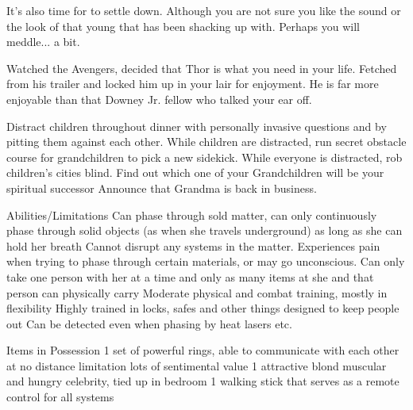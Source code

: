 \documentclass[char]{LRSguildcamp1}
\begin{document}
It's also time for \cYoungest {} to settle down. Although you are not sure you like the sound or the look of that young \cYS{\hero} that \cYoungest{} has been shacking up with. Perhaps you will meddle... a bit. 

Watched the Avengers, decided that Thor is what you need in your life. Fetched \cChrisHemsworth{\intro} from his trailer and locked him up in your lair for enjoyment. He is far more enjoyable than that Downey Jr. fellow who talked your ear off. 

\begin{itemz}[Goals]
	\item 
	Distract children throughout dinner with personally invasive questions and by pitting them against each other. 
	While children are distracted, run secret obstacle course for grandchildren to pick a new sidekick. 
	While everyone is distracted, rob children’s cities blind. 
	Find out which one of your Grandchildren will be your spiritual successor 
	Announce that Grandma is back in business. 
	
\end{itemz}

\begin{itemz}[Notes]
	\item 
	
	Abilities/Limitations 
	Can phase through sold matter, can only continuously phase through solid objects (as when she travels underground) as long as she can hold her breath 
	Cannot disrupt any systems in the matter. 
	Experiences pain when trying to phase through certain materials, or may go unconscious. 
	Can only take one person with her at a time and only as many items at she and that person can physically carry 
	Moderate physical and combat training, mostly in flexibility 
	Highly trained in locks, safes and other things designed to keep people out 
	Can be detected even when phasing by heat lasers etc. 
	
	Items in Possession
	1 set of powerful rings, able to communicate with each other at no distance limitation lots of sentimental value 
	1 attractive blond muscular and hungry celebrity, tied up in bedroom 
	1 walking stick that serves as a remote control for all systems 
	
\end{itemz}
\end{document}
